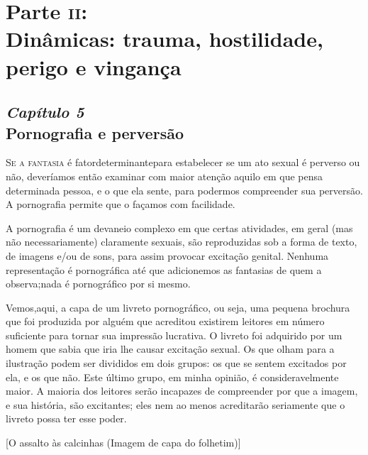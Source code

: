 \part[Parte \textsc{ii}: Dinâmicas: trauma, hostilidade, perigo e vingança]{Parte \textsc{ii}:\\ Dinâmicas: trauma, hostilidade, perigo e vingança}


\chapter[\textbf{5}\quad Pornografia e perversão]{{\large\textit{Capítulo 5}}\\ Pornografia e perversão}


\textsc{Se a fantasia}\idxfantaporn{} é fator\idxporno[|(] determinante\idxvinga[|(] para estabelecer se um ato sexual é
perverso ou não, deveríamos então examinar com maior atenção aquilo em
que pensa determinada pessoa, e o que ela sente, para podermos
compreender sua perversão. A pornografia permite que o façamos com
facilidade.

A pornografia\idxpornofant{} é um devaneio complexo em que certas atividades, em
geral (mas não necessariamente) claramente sexuais, são reproduzidas
sob a forma de texto, de imagens e/ou de sons, para assim provocar
excitação genital. Nenhuma representação é pornográfica até que
adicionemos as fantasias de quem a observa;\idxpornoplat[|(] nada é pornográfico por si
mesmo.

Vemos,\idxtravemporn[|(] aqui, a capa de um livreto pornográfico, ou seja, uma pequena
brochura que foi produzida por alguém que acreditou existirem leitores
em número suficiente para tornar sua impressão lucrativa. O livreto foi
adquirido por um homem que sabia que iria lhe causar excitação sexual.
Os que olham para a ilustração podem ser divididos em dois grupos: os
que se sentem excitados por ela, e os que não. Este último grupo, em
minha opinião, é consideravelmente maior. A maioria dos leitores serão
incapazes de compreender por que a imagem, e sua história, são
excitantes; eles nem ao menos acreditarão seriamente que o livreto
possa ter esse poder.



[O assalto às calcinhas (Imagem de capa do folhetim)]

